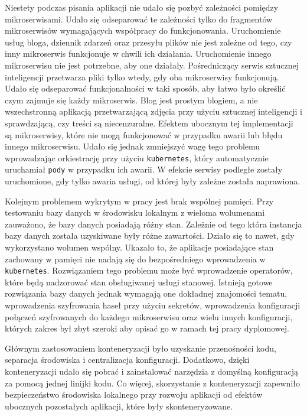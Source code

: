 \documentclass[12pt,twoside]{article}
\begin{document}
Niestety podczas pisania aplikacji nie udało się pozbyć zależności pomiędzy mikroserwisami. Udało się odseparować te zależności tylko do fragmentów mikroserwisów wymagających współpracy do funkcjonowania. Uruchomienie usług bloga, dziennik zdarzeń oraz przesyłu plików nie jest zależne od tego, czy inny mikroserwis funkcjonuje w chwili ich działania. Uruchomienie innego mikroserwisu nie jest potrzebne, aby one działały. Pośredniczący serwis sztucznej inteligencji przetwarza pliki tylko wtedy, gdy oba mikroserwisy funkcjonują. Udało się odseparować funkcjonalności w taki sposób, aby łatwo było określić czym zajmuje się każdy mikroserwis. Blog jest prostym blogiem, a nie wszechstronną aplikacją przetwarzającą zdjęcia przy użyciu sztucznej inteligencji i sprawdzającą, czy treści są niecenzuralne. Efektem ubocznym tej implementacji są mikroserwisy, które nie mogą funkcjonować w przypadku awarii lub błędu innego mikroserwisu. Udało się jednak zmniejszyć wagę tego problemu wprowadzając orkiestrację przy użyciu \texttt{kubernetes}, który automatycznie uruchamiał \texttt{pody} w przypadku ich awarii. W efekcie serwisy podległe zostały uruchomione, gdy tylko awaria usługi, od której były zależne została naprawiona.

Kolejnym problemem wykrytym w pracy jest brak wspólnej pamięci. Przy testowaniu bazy danych w środowisku lokalnym z wieloma wolumenami zauważono, że bazy danych posiadają różny stan. Zależnie od tego która instancja bazy danych została uzyskiwane były różne zawartości. Działo się to nawet, gdy wykorzystano wolumen wspólny. Ukazało to, że aplikacje posiadające stan zachowany w pamięci nie nadają się do bezpośredniego wprowadzenia w \texttt{kubernetes}. Rozwiązaniem tego problemu może być wprowadzenie operatorów, które będą nadzorować stan obsługiwanej usługi stanowej. Istnieją gotowe rozwiązania bazy danych\cite{PostgresOperator, ZalandoOperator} jednak wymagają one dokładnej znajomości tematu, wprowadzenia szyfrowania haseł przy użyciu sekretów, wprowadzenia konfiguracji połączeń szyfrowanych do każdego mikroserwisu oraz wielu innych konfiguracji, których zakres był zbyt szeroki aby opisać go w ramach tej pracy dyplomowej.

Głównym zastosowaniem konteneryzacji było uzyskanie przenośności kodu, separacja środowiska i centralizacja konfiguracji. Dodatkowo, dzięki konteneryzacji udało się pobrać i zainstalować narzędzia z domyślną konfiguracją za pomocą jednej linijki kodu. Co więcej, skorzystanie z konteneryzacji zapewniło bezpieczeństwo środowiska lokalnego przy rozwoju aplikacji od efektów ubocznych pozostałych aplikacji, które były skonteneryzowane.
\end{document}
